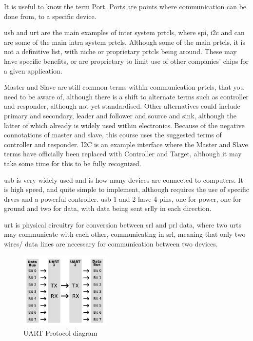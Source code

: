\documentclass[a4paper,11pt]{report}
\begin{document}
It is useful to know the term Port. Ports are points where communication can be done from, to a specific device.

\gls{usb} and \gls{urt} are the main examples of inter system \gls{prtcl}s, where \gls{spi}, \gls{i2c} and \gls{can} are some of the main intra system \gls{prtcl}s. Although some of the main \gls{prtcl}s, it is not a definitive list, with niche or proprietary \gls{prtcl}s being around. These may have specific benefits, or are proprietary to limit use of other companies' chips for a given application.

Master and Slave are still common terms within communication \gls{prtcl}s, that you need to be aware of, although there is a shift to alternate terms such as controller and responder, although not yet standardised. Other alternatives could include primary and secondary, leader and follower and source and sink, although the latter of which already is widely used within electronics. Because of the negative connotations of master and slave, this course uses the suggested terms of controller and responder. I2C is an example interface where the Master and Slave terms have officially been replaced with Controller and Target, although it may take some time for this to be fully recognized.

\gls{usb} is very widely used and is how many devices are connected to computers. It is high speed, and quite simple to implement, although requires the use of specific \gls{drvr}s and a powerful controller. \gls{usb} 1 and 2 have 4 pins, one for power, one for ground and two for data, with data being sent \gls{srl}ly in each direction.

\gls{urt} is physical circuitry for conversion between \gls{srl} and \gls{prl} data, where two \gls{urt}s may communicate with each other, communicating in \gls{srl}, meaning that only two wires/ data lines are necessary for communication between two devices.

\begin{figure}[H]
\centering
\includegraphics[width=0.4\textwidth]{UART}
\caption{UART Protocol diagram}
\end{figure}
\end{document}
